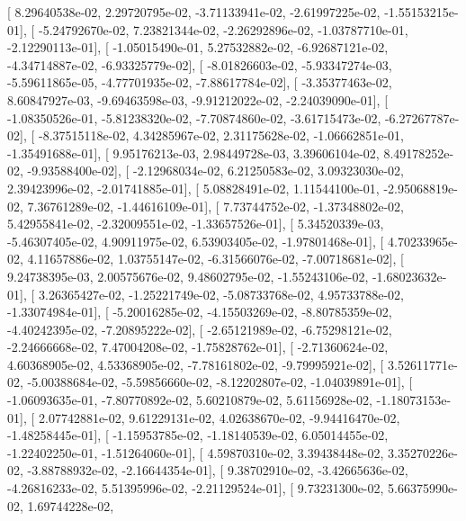 \documentclass{article}
\begin{document}
       [  8.29640538e-02,   2.29720795e-02,  -3.71133941e-02,
         -2.61997225e-02,  -1.55153215e-01],
       [ -5.24792670e-02,   7.23821344e-02,  -2.26292896e-02,
         -1.03787710e-01,  -2.12290113e-01],
       [ -1.05015490e-01,   5.27532882e-02,  -6.92687121e-02,
         -4.34714887e-02,  -6.93325779e-02],
       [ -8.01826603e-02,  -5.93347274e-03,  -5.59611865e-05,
         -4.77701935e-02,  -7.88617784e-02],
       [ -3.35377463e-02,   8.60847927e-03,  -9.69463598e-03,
         -9.91212022e-02,  -2.24039090e-01],
       [ -1.08350526e-01,  -5.81238320e-02,  -7.70874860e-02,
         -3.61715473e-02,  -6.27267787e-02],
       [ -8.37515118e-02,   4.34285967e-02,   2.31175628e-02,
         -1.06662851e-01,  -1.35491688e-01],
       [  9.95176213e-03,   2.98449728e-03,   3.39606104e-02,
          8.49178252e-02,  -9.93588400e-02],
       [ -2.12968034e-02,   6.21250583e-02,   3.09323030e-02,
          2.39423996e-02,  -2.01741885e-01],
       [  5.08828491e-02,   1.11544100e-01,  -2.95068819e-02,
          7.36761289e-02,  -1.44616109e-01],
       [  7.73744752e-02,  -1.37348802e-02,   5.42955841e-02,
         -2.32009551e-02,  -1.33657526e-01],
       [  5.34520339e-03,  -5.46307405e-02,   4.90911975e-02,
          6.53903405e-02,  -1.97801468e-01],
       [  4.70233965e-02,   4.11657886e-02,   1.03755147e-02,
         -6.31566076e-02,  -7.00718681e-02],
       [  9.24738395e-03,   2.00575676e-02,   9.48602795e-02,
         -1.55243106e-02,  -1.68023632e-01],
       [  3.26365427e-02,  -1.25221749e-02,  -5.08733768e-02,
          4.95733788e-02,  -1.33074984e-01],
       [ -5.20016285e-02,  -4.15503269e-02,  -8.80785359e-02,
         -4.40242395e-02,  -7.20895222e-02],
       [ -2.65121989e-02,  -6.75298121e-02,  -2.24666668e-02,
          7.47004208e-02,  -1.75828762e-01],
       [ -2.71360624e-02,   4.60368905e-02,   4.53368905e-02,
         -7.78161802e-02,  -9.79995921e-02],
       [  3.52611771e-02,  -5.00388684e-02,  -5.59856660e-02,
         -8.12202807e-02,  -1.04039891e-01],
       [ -1.06093635e-01,  -7.80770892e-02,   5.60210879e-02,
          5.61156928e-02,  -1.18073153e-01],
       [  2.07742881e-02,   9.61229131e-02,   4.02638670e-02,
         -9.94416470e-02,  -1.48258445e-01],
       [ -1.15953785e-02,  -1.18140539e-02,   6.05014455e-02,
         -1.22402250e-01,  -1.51264060e-01],
       [  4.59870310e-02,   3.39438448e-02,   3.35270226e-02,
         -3.88788932e-02,  -2.16644354e-01],
       [  9.38702910e-02,  -3.42665636e-02,  -4.26816233e-02,
          5.51395996e-02,  -2.21129524e-01],
       [  9.73231300e-02,   5.66375990e-02,   1.69744228e-02,
\end{document}
